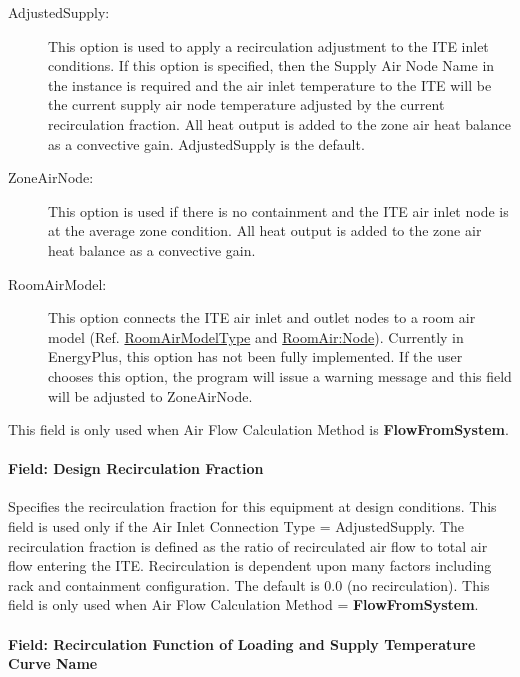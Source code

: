 \begin{description}
	\item[AdjustedSupply:] This option is used to apply a recirculation adjustment to the ITE inlet conditions. If this option is specified, then the Supply Air Node Name in the instance is required and the air inlet temperature to the ITE will be the current supply air node temperature adjusted by the current recirculation fraction. All heat output is added to the zone air heat balance as a convective gain. AdjustedSupply is the default.

	\item[ZoneAirNode:] This option is used if there is no containment and the ITE air inlet node is at the average zone condition. All heat output is added to the zone air heat balance as a convective gain.

	\item[RoomAirModel:] This option connects the ITE air inlet and outlet nodes to a room air model (Ref. \hyperref[roomairmodeltype]{RoomAirModelType} and \hyperref[roomairnode]{RoomAir:Node}).  Currently in EnergyPlus, this option has not been fully implemented.  If the user chooses this option, the program will issue a warning message and this field will be adjusted to ZoneAirNode.
\end{description}

This field is only used when Air Flow Calculation Method is \textbf{FlowFromSystem}.

\paragraph{Field: Design Recirculation Fraction}\label{field-design-recirculation-fraction-ite-definition}

Specifies the recirculation fraction for this equipment at design conditions. This field is used only if the Air Inlet Connection Type = AdjustedSupply. The recirculation fraction is defined as the ratio of recirculated air flow to total air flow entering the ITE. Recirculation is dependent upon many factors including rack and containment configuration. The default is 0.0 (no recirculation). This field is only used when Air Flow Calculation Method = \textbf{FlowFromSystem}.

\paragraph{Field: Recirculation Function of Loading and Supply Temperature Curve Name}\label{field-recirculation-function-of-loading-and-supply-temperature-curve-name-ite-definition}

